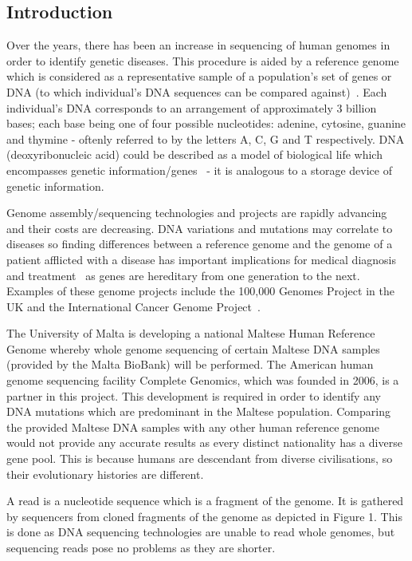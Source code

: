 \documentclass{csfyp}
\begin{document}
\begin{small}
\section{Introduction}\vspace{-3ex}
\label{s:intro}

Over the years, there has been an increase in sequencing of human genomes in order to identify genetic diseases.  This procedure is aided by a reference genome which is considered as a representative sample of a population's set of genes or DNA (to which individual's DNA sequences can be compared against)~\cite{omics}.  Each individual's DNA corresponds to an arrangement of approximately 3 billion bases; each base being one of four possible nucleotides: adenine, cytosine, guanine and thymine - oftenly referred to by the letters A, C, G and T respectively.  DNA (deoxyribonucleic acid) could be described as a model of biological life which encompasses genetic information/genes~\cite{aiBk, introgenom} - it is analogous to a storage device of genetic information.  

Genome assembly/sequencing technologies and projects are rapidly advancing and their costs are decreasing.  DNA variations and mutations may correlate to diseases so finding differences between a reference genome and the genome of a patient afflicted with a disease has important implications for medical diagnosis and treatment~\cite{think} as genes are hereditary from one generation to the next.  Examples of these genome projects include the 100,000 Genomes Project in the UK and the International Cancer Genome Project~\cite{bwtransform, refcompression, popgen}.

The University of Malta is developing a national Maltese Human Reference Genome whereby whole genome sequencing of certain Maltese DNA samples (provided by the Malta BioBank) will be performed.  The American human genome sequencing facility Complete Genomics, which was founded in 2006, is a partner in this project.  This development is required in order to identify any DNA mutations which are predominant in the Maltese population.  Comparing the provided Maltese DNA samples with any other human reference genome would not provide any accurate results as every distinct nationality has a diverse gene pool.  This is because humans are descendant from diverse civilisations, so their evolutionary histories are different.  

A read is a nucleotide sequence which is a fragment of the genome.  It is gathered by sequencers from cloned fragments of the genome as depicted in Figure 1.  This is done as DNA sequencing technologies are unable to read whole genomes, but sequencing reads pose no problems as they are shorter.  


\end{small}
\end{document}

